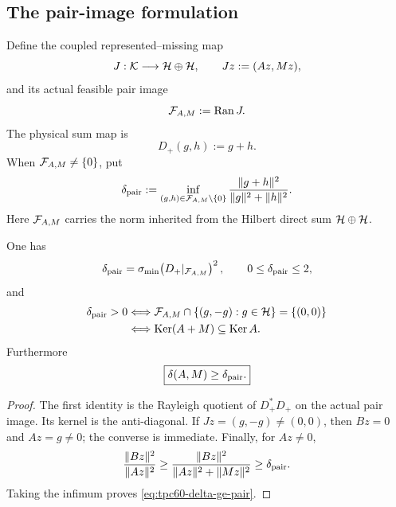 \subsection{The pair-image formulation}

Define the coupled represented--missing map
\begin{equation}
 J:\mathcal K\longrightarrow\mathcal H\oplus\mathcal H,
 \qquad Jz:=(Az,Mz),
 \label{eq:tpc60-coupled-AM-map}
\end{equation}
and its actual feasible pair image
\begin{equation}
 \mathcal F_{A,M}:=\operatorname{Ran} J.
 \label{eq:tpc60-feasible-pair-image}
\end{equation}
The physical sum map is
\begin{equation}
 D_+(g,h):=g+h.
 \label{eq:tpc60-pair-sum-map}
\end{equation}
When \(\mathcal F_{A,M}\ne\{0\}\), put
\begin{equation}
 \delta_{\rm pair}
 :=\inf_{(g,h)\in\mathcal F_{A,M}\setminus\{0\}}
   \frac{\|g+h\|^2}{\|g\|^2+\|h\|^2}.
 \label{eq:tpc60-pair-angle}
\end{equation}
Here \(\mathcal F_{A,M}\) carries the norm inherited from the Hilbert direct sum
\(\mathcal H\oplus\mathcal H\).

\begin{proposition}
\label{prop:tpc60-anti-diagonal-test}
One has
\begin{equation}
 \delta_{\rm pair}
 =\sigma_{\min}\!\left(D_+|_{\mathcal F_{A,M}}\right)^2,
 \qquad 0\le\delta_{\rm pair}\le2,
 \label{eq:tpc60-pair-singular-value}
\end{equation}
and
\begin{align}
 \delta_{\rm pair}>0
 &\Longleftrightarrow
 \mathcal F_{A,M}\cap\{(g,-g):g\in\mathcal H\}=\{(0,0)\}
 \label{eq:tpc60-pair-antidiagonal}\\
 &\Longleftrightarrow
 \operatorname{Ker}(A+M)\subseteq\operatorname{Ker} A.
 \notag
\end{align}
Furthermore
\begin{equation}
 \boxed{\delta(A,M)\ge\delta_{\rm pair}.}
 \label{eq:tpc60-delta-ge-pair}
\end{equation}
\end{proposition}

\begin{proof}
The first identity is the Rayleigh quotient of \(D_+^*D_+\) on the actual
pair image.  Its kernel is the anti-diagonal.  If
\(Jz=(g,-g)\ne(0,0)\), then \(Bz=0\) and \(Az=g\ne0\); the converse is
immediate.  Finally, for \(Az\ne0\),
\[
 \frac{\|Bz\|^2}{\|Az\|^2}
 \ge
 \frac{\|Bz\|^2}{\|Az\|^2+\|Mz\|^2}
 \ge\delta_{\rm pair}.
\]
Taking the infimum proves \eqref{eq:tpc60-delta-ge-pair}.
\end{proof}

